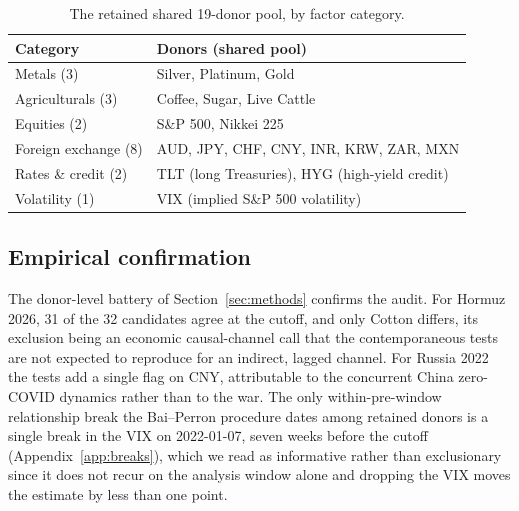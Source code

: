 \begin{table}[h]
\centering
\caption{The retained shared 19-donor pool, by factor category.}
\label{tab:donors}
\begin{threeparttable}
\small
\begin{tabular}{@{}lp{10.5cm}@{}}
\toprule
Category & Donors (shared pool) \\
\midrule
Metals (3) & Silver, Platinum, Gold \\
Agriculturals (3) & Coffee, Sugar, Live Cattle \\
Equities (2) & S\&P 500, Nikkei 225 \\
Foreign exchange (8) & AUD, JPY, CHF, CNY, INR, KRW, ZAR, MXN \\
Rates \& credit (2) & TLT (long Treasuries), HYG (high-yield credit) \\
Volatility (1) & VIX (implied S\&P 500 volatility) \\
\bottomrule
\end{tabular}
\end{threeparttable}
\end{table}

\subsection{Empirical confirmation}
The donor-level battery of Section~\ref{sec:methods} confirms the audit. For Hormuz 2026, 31
of the 32 candidates agree at the cutoff, and only Cotton differs, its exclusion being an
economic causal-channel call that the contemporaneous tests are not expected to reproduce for
an indirect, lagged channel. For Russia 2022 the tests add a single flag on CNY, attributable
to the concurrent China zero-COVID dynamics rather than to the war. The only within-pre-window
relationship break the Bai--Perron procedure dates among retained donors is a single break in
the VIX on 2022-01-07, seven weeks before the cutoff (Appendix~\ref{app:breaks}), which we
read as informative rather than exclusionary since it does not recur on the analysis window
alone and dropping the VIX moves the estimate by less than one point.
